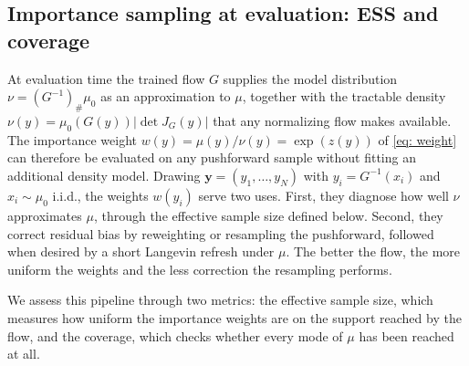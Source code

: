 \documentclass{article}
\begin{document}

\subsection{Importance sampling at evaluation: ESS and coverage}
\label{subsec: eval}

At evaluation time the trained flow $G$ supplies the model distribution $\nu = (G^{-1})_{\#}\mu_0$ as an approximation to $\mu$, together with the tractable density $\nu(y) = \mu_0(G(y))|\det J_G(y)|$ that any normalizing flow makes available. The importance weight $w(y) = \mu(y)/\nu(y) = \exp(z(y))$ of \eqref{eq: weight} can therefore be evaluated on any pushforward sample without fitting an additional density model. Drawing $\mathbf y = (y_1,\dots,y_N)$ with $y_i = G^{-1}(x_i)$ and $x_i\sim\mu_0$ i.i.d., the weights $w(y_i)$ serve two uses. First, they diagnose how well $\nu$ approximates $\mu$, through the effective sample size defined below. Second, they correct residual bias by reweighting or resampling the pushforward, followed when desired by a short Langevin refresh under $\mu$. The better the flow, the more uniform the weights and the less correction the resampling performs.

We assess this pipeline through two metrics: the effective sample size, which measures how uniform the importance weights are on the support reached by the flow, and the coverage, which checks whether every mode of $\mu$ has been reached at all.
\end{document}
